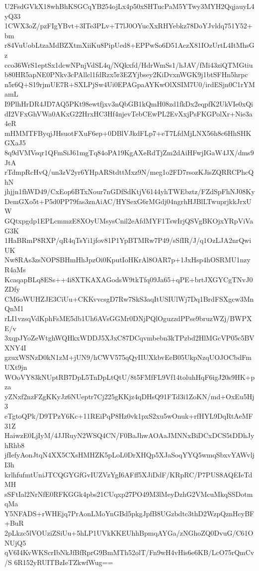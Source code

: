 U2FsdGVkX18whBhKSGCqYB254ojLx4p50xSHTucPaM5YTwy3MYH2QqjauyL4yQ33
1CWX3oZ/pzFIgYBvt+3ITe3PLv+T7lJ0OYucXxRHYebkz78DoYJvldq751Y52+bm
r84VuUobLtzaMdBZXtmXiiKu8PipUed8+EPPwSo6D51AczX81IOzUrtL4ItMhsGz
cco36WrS1eptSx1dcwNPnjVdSL4q/NQkxfd/HdrWmSs1/hJAV/fMi43ziQTMGtiu
b80HR5apNE0PNkv3cPAllcl1fdRzx5r3EZYjbsey2KiDvxnWGK9j1btSFHn5hrpc
n5r6Q+S19rjmUE7R+SXLPjSw4Ui0EPAGpaAYKwOlXSIM7U0/irdESjn0C1rYMamL
I9PlhHrDR4JD7AQ5PKt98ewtfjxv3nQbGB1kQmH08zd1fkDx2eqpfK2UkVIe0xQi
dI2VFxGhVWa0AKxG22HrxHC3Hf4njevTebCEwPL2EvXxjPsFKGPolXr+Nie3a4eR
mHMMTFByqjJHsuotFXuF6ep+0DBlVJkdFLp7+eT7LfdMjLNX56h8c6HhSHKGXaJ5
8q9dVMVsqr1QFmSiJ61mgTq84oPA19KgAXeRdTjZm2dAiHFwjIGaW4JX/dms9JtA
rTdmpRcHvQ/un3zV2yr6YHpARStdttMxz9N/meg1o2FD7rsozKJisZQRRCPhcQhN
jhjjn1fhWD49/CxEop6BTxNour7nGDfSdKtjV6144yhTWEbztz/FZdSpFhNJ08Ky
DemGXo5t+P5d0PP79fas3znAiAC/HYSexG6rMGdj04ngrhHJBlLTwuprjkkJrxUW
GQtxpgdp1EPLcmmzE8XOyUMsysCnil2eAfdMYF1TswIrjQSVgBKOjxYRpViVaG3K
1HaBRmP8RXP/qR4qTsYi1jfov81P1YpBTMRw7P49/sSfIR/J/q1OzLJA2nrQwiUK
Nw8RAs3zsNOPSBHmHhJpzOi0KputIoHKrAl8OAR7p+1JxHsp4hOSRMU1nzyR4aMs
KcaqapBLq8ESs++4i8XTKAXAGodsW9tkTfq09Ja65+qPE+brtJXGYCgTNvJ0ZDfy
CM6oWUHZJE3CiUu+CKKvvcsgD7Rw7SkS3aqItUSIUlWj7Dq1BrdFSXgcw3MnQnM1
rLI1vzsqVdKphFsME5db1Uh6AVsGGMr0DNjPQlOguzzdPPse9bruzWZj/BWPXE/v
3xqpJYoZeWtghWQHkxWDDJ5XJxC87DCqvmbebn3kTPzbd2HlMGcVP05c5BVXNY4I
gzuxWSNzD0kN1zM+jUN9/hCWV575qQyIIUXkbvEeB05UkpNzqUOJOCbdFmUXt9jn
WOoVY83kNUptRB7DpL5TnDpLtQtU/8t5FMfFL9Vf14toluhHqF6igJ20s9HK+pza
yZNxf2nzFZgKKyJz6NUeptr7Cj225gKKjz4qDHsQ91FTd3i1ZoKN/md+OxEu5Hj3
eTgtoQPk/D9TPzY6Kc+11REiPqP8Hz0vk1pxS2xu5wOnuk+rfHYL9DqRtAeMF31Z
HaiwzE0LjIyM/4JJRuyN2WSQ4CN/F0BaJhwAOAaJMNNxBiDCxDCS5tDDhJyhRhb8
jfIefyAonJtqN4XX5CXsHMHZK5pLoL0DrXHQp5XJaSoqYYQ5wmqSbxvYAWvljI3h
krlhfufmtUniJTCQGYGfGvIUZVzYgI6AFff5XJiDdF/KRpRC/P7PUS8AQEIeTdMH
sSFtIal2NrNfE0RFKGGk4pbs21CUqxp27PO49M3lMeyDzhG2VMcuMkqSSDotmqMa
Y5NFADS+rWHEjq7PrAonLMoYnGBd5pkgJpfB8UGzbdtc3thD2WzpQznHcyBF+BuR
2pLkzc5lVOUziZSiUu+5hLP1UVkKKEUhhBpmqAYGa/zNGhoZQ0DvuG/C61ONUjQ5
qV6I4KvWKScrIbNkJfBfRprG9BmMTh52olT/Fn9wH4vHis6e6KB/LcO75rQmCv/S
6R152yRUITBzIeTZkwfWug==

